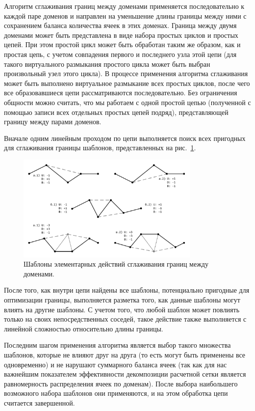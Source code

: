 \documentclass[a4paper,14pt]{extarticle}                     %
\theoremstyle{plain}                                         %
\begin{document}
Алгоритм сглаживания границ между доменами применяется последовательно к каждой паре доменов и направлен на уменьшение длины границы между ними с сохранением баланса количества ячеек в этих доменах.
Граница между двумя доменами может быть представлена в виде набора простых циклов и простых цепей.
При этом простой цикл может быть обработан таким же образом, как и простая цепь, с учетом совпадения первого и последнего узла этой цепи (для такого виртуального размыкания простого цикла может быть выбран произвольный узел этого цикла).
В процессе применения алгоритма сглаживания может быть выполнено виртуальное размыкание всех простых циклов, после чего все образовавшиеся цепи рассматриваются последовательно.
Без ограничения общности можно считать, что мы работаем с одной простой цепью (полученной с помощью записи всех отдельных простых цепей подряд), представляющей границу между парами доменов.

Вначале одним линейным проходом по цепи выполняется поиск всех пригодных для сглаживания границы шаблонов, представленных на рис.~\ref{fig:text_2_smooth_smooth_border}.

\begin{figure}[ht]
\centering
\includegraphics[width=0.8\textwidth]{./pics/text_2_smooth/smooth-border.pdf}
\singlespacing
\caption{Шаблоны элементарных действий сглаживания границ между доменами.}
\label{fig:text_2_smooth_smooth_border}
\end{figure}

После того, как внутри цепи найдены все шаблоны, потенциально пригодные для оптимизации границы, выполняется разметка того, как данные шаблоны могут влиять на другие шаблоны.
С учетом того, что любой шаблон может повлиять только на своих непосредственных соседей, такое действие также выполняется с линейной сложностью относительно длины границы.

Последним шагом применения алгоритма является выбор такого множества шаблонов, которые не влияют друг на друга (то есть могут быть применены все одновременно) и не нарушают суммарного баланса ячеек (так как для нас важнейшим показателем эффективности декомпозиции расчетной сетки является равномерность распределения ячеек по доменам).
После выбора наибольшего возможного набора шаблонов они применяются, и на этом обработка цепи считается завершенной.
\end{document}

